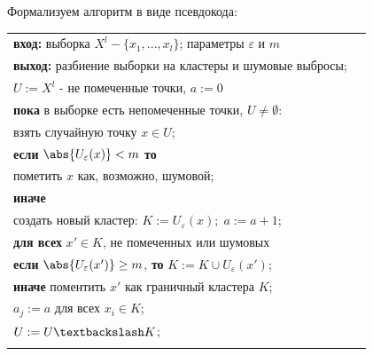 Формализуем алгоритм в виде псевдокода:\\
\begin{tabularx}{\linewidth}{lX}
\textbf{вход:} выборка $X^l - \{x_1,...,x_l\}$; параметры $\varepsilon$ и $m$\\
\textbf{выход:} разбиение выборки на кластеры и шумовые выбросы;\\\hspace*{7mm}\hspace*{9mm}$U := X^l$ - не помеченные точки, $a := 0$\\
\textbf{пока} в выборке есть непомеченные точки, $U \neq \emptyset$:\\
\hspace*{7mm} взять случайную точку $x \in U$; \\
\hspace*{7mm} \textbf{если} $\abs{U_\varepsilon (x)} < m$ \textbf{то} \\
\hspace*{7mm}\hspace*{7mm} пометить $x$ как, возможно, шумовой;\\
\hspace*{7mm}\textbf{иначе} \\
\hspace*{7mm}\hspace*{7mm} создать новый кластер: $K:=U_\varepsilon (x); \; a:=a+1;$ \\
\hspace*{7mm}\hspace*{7mm} \textbf{для всех} $x' \in K$, не помеченных или шумовых \\
\hspace*{7mm}\hspace*{7mm}\hspace*{7mm} \textbf{если} $\abs{U_\varepsilon (x')} \geq m$,  \textbf{то} $K := K \cup U_\varepsilon (x')$; \\
\hspace*{7mm}\hspace*{7mm}\hspace*{7mm} \textbf{иначе} поментить $x'$ как граничный кластера $K$;\\
\hspace*{7mm}\hspace*{7mm} $a_j := a$ для всех $x_i \in K$;\\
\hspace*{7mm}\hspace*{7mm} $U := U \textbackslash K$;\\
\vspace{5mm}
\end{tabularx}

